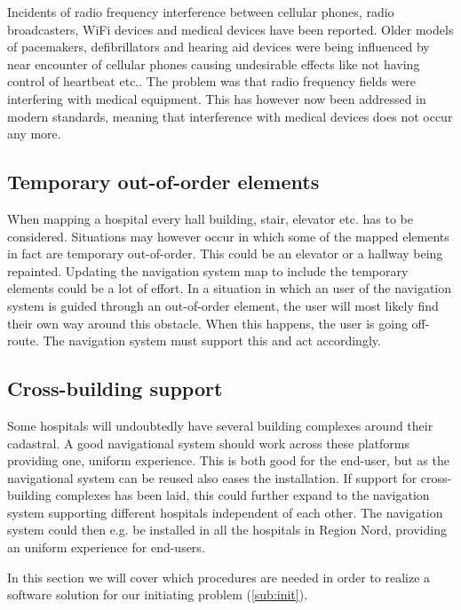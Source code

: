 Incidents of radio frequency interference between cellular phones, radio broadcasters, WiFi devices and medical devices have been reported. Older models of pacemakers, defibrillators and hearing aid devices were being influenced by near encounter of cellular phones causing undesirable effects like not having control of heartbeat etc.. The problem was that radio frequency fields were interfering with medical equipment. This has however now been addressed in modern standards, meaning that interference with medical devices does not occur any more. \cite{Man1998,Case}

\subsection{Temporary out-of-order elements}

When mapping a hospital every hall building, stair, elevator etc. has to be considered. Situations may however occur in which some of the mapped elements in fact are temporary out-of-order. This could be an elevator or a hallway being repainted. Updating the navigation system map to include the temporary elements could be a lot of effort. In a situation in which an user of the navigation system is guided through an out-of-order element, the user will most likely find their own way around this obstacle. When this happens, the user is going off-route. The navigation system must support this and act accordingly.


\subsection{Cross-building support}

Some hospitals will undoubtedly have several building complexes around their cadastral. A good navigational system should work across these platforms providing one, uniform experience. This is both good for the end-user, but as the navigational system can be reused also eases the installation. If support for cross-building complexes has been laid, this could further expand to the navigation system supporting different hospitals independent of each other. The navigation system could then e.g. be installed in all the hospitals in Region Nord, providing an uniform experience for end-users.



In this section we will cover which procedures are needed in order to realize a software solution for our initiating problem (\cref{sub:init}).

